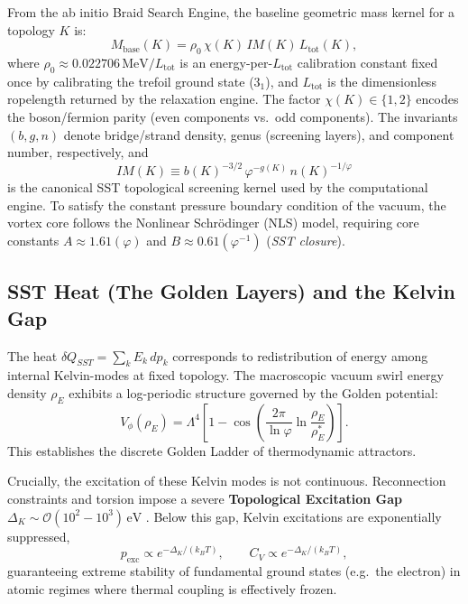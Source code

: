 \documentclass[11pt, a4paper]{article}
\newcommand{\rhoE}{\rho_{\!E}}
\newcommand{\Ltot}{L_{\text{tot}}}
\newcommand{\goldenratio}{\varphi}
\begin{document}
                From the ab initio Braid Search Engine, the baseline geometric mass kernel for a topology $K$ is:
                \begin{equation}
                    M_{\text{base}}(K) = \rho_0\,\chi(K)\,IM(K)\,\Ltot(K),
                \end{equation}
                where $\rho_0 \approx 0.022706\,\mathrm{MeV}/\Ltot$ is an energy-per-$\Ltot$ calibration constant fixed once by calibrating the trefoil ground state ($3_1$), and \(\Ltot\) is the dimensionless ropelength returned by the relaxation engine. The factor $\chi(K)\in\{1,2\}$ encodes the boson/fermion parity (even components vs.\ odd components). The invariants $(b,g,n)$ denote bridge/strand density, genus (screening layers), and component number, respectively, and
                \begin{equation}
                    IM(K) \equiv b(K)^{-3/2}\,\goldenratio^{-g(K)}\,n(K)^{-1/\goldenratio}
                \end{equation}
                is the canonical SST topological screening kernel used by the computational engine.
                To satisfy the constant pressure boundary condition of the vacuum, the vortex core follows the Nonlinear Schr\"odinger (NLS) model, requiring core constants $A \approx 1.61 (\goldenratio)$ and $B \approx 0.61 (\goldenratio^{-1})$ (\emph{SST closure}).
            
            \subsection{SST Heat (The Golden Layers) and the Kelvin Gap}
                The heat $\delta Q_{SST} = \sum_k E_k\, dp_k$ corresponds to redistribution of energy among internal Kelvin-modes at fixed topology. The macroscopic vacuum swirl energy density $\rhoE$ exhibits a log-periodic structure governed by the Golden potential:
                \begin{equation}
                    V_{\phi}(\rhoE) = \Lambda^4 \left[ 1 - \cos\left(\frac{2\pi}{\ln \goldenratio} \ln \frac{\rhoE}{\rho_{\!E}^*} \right) \right].
                \end{equation}
                This establishes the discrete Golden Ladder of thermodynamic attractors.
                
                Crucially, the excitation of these Kelvin modes is not continuous. Reconnection constraints and torsion impose a severe \textbf{Topological Excitation Gap} $\Delta_K \sim \mathcal{O}(10^2 - 10^3)\,\mathrm{eV}$ \cite{Iskandarani_Kelvin}. Below this gap, Kelvin excitations are exponentially suppressed,
                \begin{equation}
                    p_{\mathrm{exc}} \propto e^{-\Delta_K/(k_B T)},
                    \qquad
                    C_V \propto e^{-\Delta_K/(k_B T)},
                \end{equation}
                guaranteeing extreme stability of fundamental ground states (e.g.\ the electron) in atomic regimes where thermal coupling is effectively frozen.
            
\end{document}
